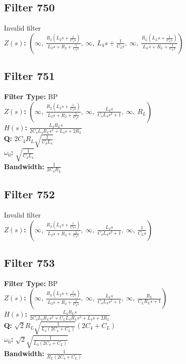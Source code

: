 \documentclass{article}
\begin{document}
\subsection*{Filter 750}
Invalid filter \\ 
\textbf{$Z(s)$:} $\left( \infty, \  \frac{R_{2} \left(L_{2} s + \frac{1}{C_{2} s}\right)}{L_{2} s + R_{2} + \frac{1}{C_{2} s}}, \  \infty, \  L_{4} s + \frac{1}{C_{4} s}, \  \infty, \  \frac{R_{L} \left(L_{L} s + \frac{1}{C_{L} s}\right)}{L_{L} s + R_{L} + \frac{1}{C_{L} s}}\right)$ \\ 
\subsection*{Filter 751}
\textbf{Filter Type:} BP \\ 
\textbf{$Z(s)$:} $\left( \infty, \  \frac{R_{2} \left(L_{2} s + \frac{1}{C_{2} s}\right)}{L_{2} s + R_{2} + \frac{1}{C_{2} s}}, \  \infty, \  \frac{L_{4} s}{C_{4} L_{4} s^{2} + 1}, \  \infty, \  R_{L}\right)$ \\ 
\textbf{$H(s)$:} $\frac{L_{4} R_{L} s}{2 C_{4} L_{4} R_{L} s^{2} + L_{4} s + 2 R_{L}}$ \\ 
\textbf{Q:} $2 C_{4} R_{L} \sqrt{\frac{1}{C_{4} L_{4}}}$ \\ 
\textbf{$\omega_0$:} $\sqrt{\frac{1}{C_{4} L_{4}}}$ \\ 
\textbf{Bandwidth:} $\frac{1}{2 C_{4} R_{L}}$ \\ 
\subsection*{Filter 752}
Invalid filter \\ 
\textbf{$Z(s)$:} $\left( \infty, \  \frac{R_{2} \left(L_{2} s + \frac{1}{C_{2} s}\right)}{L_{2} s + R_{2} + \frac{1}{C_{2} s}}, \  \infty, \  \frac{L_{4} s}{C_{4} L_{4} s^{2} + 1}, \  \infty, \  \frac{1}{C_{L} s}\right)$ \\ 
\subsection*{Filter 753}
\textbf{Filter Type:} BP \\ 
\textbf{$Z(s)$:} $\left( \infty, \  \frac{R_{2} \left(L_{2} s + \frac{1}{C_{2} s}\right)}{L_{2} s + R_{2} + \frac{1}{C_{2} s}}, \  \infty, \  \frac{L_{4} s}{C_{4} L_{4} s^{2} + 1}, \  \infty, \  \frac{R_{L}}{C_{L} R_{L} s + 1}\right)$ \\ 
\textbf{$H(s)$:} $\frac{L_{4} R_{L} s}{2 C_{4} L_{4} R_{L} s^{2} + C_{L} L_{4} R_{L} s^{2} + L_{4} s + 2 R_{L}}$ \\ 
\textbf{Q:} $\sqrt{2} R_{L} \sqrt{\frac{1}{L_{4} \left(2 C_{4} + C_{L}\right)}} \left(2 C_{4} + C_{L}\right)$ \\ 
\textbf{$\omega_0$:} $\sqrt{2} \sqrt{\frac{1}{L_{4} \left(2 C_{4} + C_{L}\right)}}$ \\ 
\textbf{Bandwidth:} $\frac{1}{R_{L} \left(2 C_{4} + C_{L}\right)}$ \\ 
\end{document}
